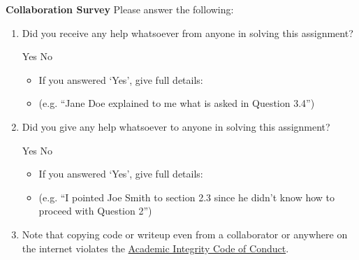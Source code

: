 \documentclass[11pt,addpoints,answers]{exam}
\numberwithin{equation}{section} %
\numberwithin{figure}{section} %
\numberwithin{table}{section} %
\begin{document}
\clearpage

\clearpage

\textbf{Collaboration Survey} Please answer the following:

\begin{enumerate}
    \item Did you receive any help whatsoever from anyone in solving this assignment?
    \begin{checkboxes}
     \choice Yes
     \choice No
    \end{checkboxes}
    \begin{itemize}
        \item If you answered `Yes', give full details:
        \item (e.g. “Jane Doe explained to me what is asked in Question 3.4”)
    \end{itemize}

    \begin{tcolorbox}[fit,height=3cm,blank, borderline={1pt}{-2pt},nobeforeafter]
    \end{tcolorbox}

    \item Did you give any help whatsoever to anyone in solving this assignment?
    \begin{checkboxes}
     \choice Yes
     \choice No\
    \end{checkboxes}
    \begin{itemize}
        \item If you answered `Yes', give full details:
        \item (e.g. “I pointed Joe Smith to section 2.3 since he didn’t know how to proceed with Question 2”)
    \end{itemize}

    \begin{tcolorbox}[fit,height=3cm,blank, borderline={1pt}{-2pt},nobeforeafter]
    \end{tcolorbox}

    \item Note that copying code or writeup even from a collaborator or anywhere on the internet violates the \href{hhttps://www.cmu.edu/policies/student-and-student-life/academic-integrity.html}{Academic Integrity Code of Conduct}.
\end{enumerate}
\end{document}
